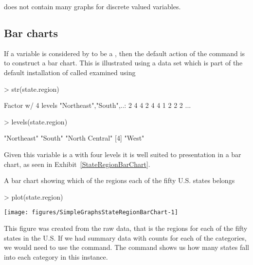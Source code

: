 \R{} does not contain many graphs for discrete valued variables. 
 
\subsection{Bar charts} 
\label{BarCharts} 
 
If a variable is considered by \R{} to be a , then the default action of the  command is to construct a bar chart. This is illustrated using a data set which is part of the default installation of \R{} called  examined using 

\begin{Schunk}
\begin{Sinput}
> str(state.region) 
\end{Sinput}
\begin{Soutput}
 Factor w/ 4 levels "Northeast","South",..: 2 4 4 2 4 4 1 2 2 2 ...
\end{Soutput}
\begin{Sinput}
> levels(state.region) 
\end{Sinput}
\begin{Soutput}
[1] "Northeast"     "South"         "North Central"
[4] "West"         
\end{Soutput}
\end{Schunk}

Given this variable is a  with four levels it is well suited to presentation in a bar chart, as seen in Exhibit~\ref{StateRegionBarChart}. 
 
\begin{exhibit} 
\begin{center} 
\caption{A bar chart showing which of the regions each of the fifty U.S. states belongs} 
\label{StateRegionBarChart} 

\begin{Schunk}
\begin{Sinput}
> plot(state.region) 
\end{Sinput}

\texttt{[image: figures/SimpleGraphsStateRegionBarChart-1]} \end{Schunk}

\end{center} 
\end{exhibit} 
 
This figure was created from the raw data, that is the regions for each of the fifty states in the U.S. If we had summary data with counts for each of the categories, we would need to use the  command. The  command shows us how many states fall into each category in this instance. 

